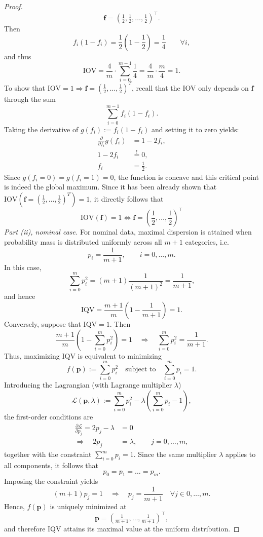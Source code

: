 ﻿\documentclass[12pt,a4paper]{scrreprt}
\theoremstyle{definition}
\begin{document}
\begin{proof}
\[
\boldsymbol{f} = \left(\tfrac{1}{2}, \tfrac{1}{2}, \ldots, \tfrac{1}{2}\right)^\top.
\]
Then
\[
f_i(1 - f_i) = \frac{1}{2}\left(1 - \frac{1}{2}\right) = \frac{1}{4} \qquad \forall i,
\]
and thus
\[
\mathrm{IOV}
= \frac{4}{m} \cdot \sum_{i=0}^{m-1} \frac{1}{4}
= \frac{4}{m} \cdot \frac{m}{4}
= 1.
\]
To show that $\mathrm{IOV} = 1 \Rightarrow \boldsymbol{f} = (\tfrac{1}{2}, \ldots, \tfrac{1}{2})^T$, recall that the IOV only depends on $\boldsymbol{f}$ through the sum
\[
\sum_{i=0}^{m-1} f_i (1 - f_i).
\]
Taking the derivative of $g(f_i) := f_i(1-f_i)$  and setting it to zero yields:
\begin{align*}
\frac{\partial}{\partial f_i} g(f_i) &= 1 - 2 f_i, \\
1 - 2 f_i &\overset{!}{=} 0, \\
f_i &= \frac{1}{2}.
\end{align*}
Since $g(f_i=0) = g(f_i = 1)=0$, the function is concave and this critical point is indeed the global maximum.
Since it has been already shown that $\mathrm{IOV}(\boldsymbol{f} = (\frac{1}{2}, \ldots, \frac{1}{2})^T) = 1$, it directly follows that
\[
\mathrm{IOV}(\boldsymbol{f}) = 1 \Leftrightarrow \boldsymbol{f} = (\frac{1}{2}, \ldots, \frac{1}{2})^\top
\]
\textit{Part (ii), nominal case.} %
For nominal data, maximal dispersion is attained when probability mass is distributed uniformly across all $m+1$ categories, i.e.
\[
p_i = \frac{1}{m+1}, \qquad i = 0,\ldots,m.
\]
In this case,
\[
\sum_{i=0}^m p_i^2 = (m+1)\frac{1}{(m+1)^2} = \frac{1}{m+1},
\]
and hence
\[
\mathrm{IQV}
= \frac{m+1}{m}\left(1 - \frac{1}{m+1}\right)
= 1.
\]
Conversely, suppose that $\mathrm{IQV} = 1$. Then
\[
\frac{m+1}{m}\left(1 - \sum_{i=0}^m p_i^2\right) = 1
\quad\Longrightarrow\quad
\sum_{i=0}^m p_i^2 = \frac{1}{m+1}.
\]
Thus, maximizing $\mathrm{IQV}$ is equivalent to minimizing
\[
f(\boldsymbol p) := \sum_{i=0}^m p_i^2
\quad \text{subject to} \quad
\sum_{i=0}^m p_i = 1.
\]
Introducing the Lagrangian (with Lagrange multiplier $\lambda$)
\[
\mathcal L(\boldsymbol p, \lambda)
:= \sum_{i=0}^m p_i^2 - \lambda\left(\sum_{i=0}^m p_i - 1\right),
\]
the first-order conditions are
\begin{align*}
    \frac{\partial \mathcal L}{\partial p_j} = 2p_j - \lambda &= 0\\
    \Rightarrow \quad 2p_j &= \lambda, \qquad j=0,\dots,m,
\end{align*}
together with the constraint $\sum_{i=0}^m p_i = 1$.
Since the same multiplier $\lambda$ applies to all components, it follows that
\[
p_0 = p_1 = \dots = p_m.
\]
Imposing the constraint yields
\[
(m+1)p_j = 1 \quad \Longrightarrow \quad p_j = \frac{1}{m+1} \quad \forall j \in 0,\dots, m .
\]
Hence, $f(\boldsymbol p)$ is uniquely minimized at
\[
\boldsymbol p = \left(\tfrac{1}{m+1}, \dots, \tfrac{1}{m+1}\right)^\top,
\]
and therefore $\mathrm{IQV}$ attains its maximal value at the uniform distribution.

\end{proof}
\end{document}

